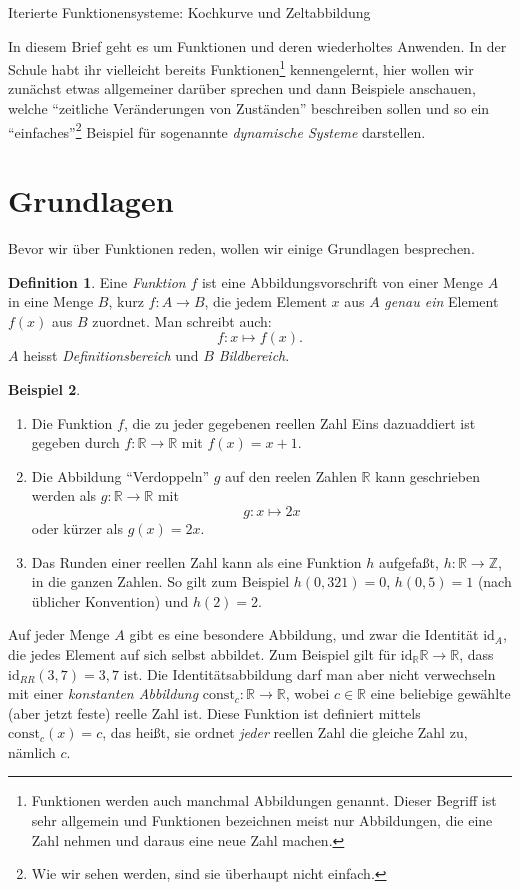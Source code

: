 \documentclass[a4paper,ngerman,12pt]{zirkelblatt1415}
\theoremstyle{definition}
\newtheorem{definition}{Definition}
\newtheorem{beispiel}[definition]{Beispiel}
\theoremstyle{remark}
\newcommand{\RR}{\mathbb{R}}
\newcommand{\lra}{\longrightarrow}
\newcommand{\id}{\text{id}}
\begin{document}
\begin{center}\Large{Iterierte Funktionensysteme: Kochkurve und Zeltabbildung}\end{center}

In diesem Brief geht es um Funktionen und deren wiederholtes Anwenden. In der Schule habt ihr vielleicht bereits Funktionen\footnote{Funktionen werden auch manchmal Abbildungen genannt. Dieser Begriff ist sehr allgemein und Funktionen bezeichnen meist nur Abbildungen, die eine Zahl nehmen und daraus eine neue Zahl machen.} kennengelernt, hier wollen wir zunächst etwas allgemeiner darüber sprechen und dann Beispiele anschauen, welche "`zeitliche Veränderungen von Zuständen"' beschreiben sollen und so ein "`einfaches"'\footnote{Wie wir sehen werden, sind sie überhaupt nicht einfach.} Beispiel für sogenannte \emph{dynamische Systeme} darstellen.

\section{Grundlagen}

Bevor wir über Funktionen reden, wollen wir einige Grundlagen besprechen.
\begin{definition}
Eine \emph{Funktion} $f$ ist eine Abbildungsvorschrift von einer Menge $A$ in eine Menge $B$, kurz $f:A\rightarrow B$, die jedem Element $x$ aus $A$ \emph{genau ein} Element $f(x)$ aus $B$ zuordnet.
Man schreibt auch:
\[
f: x \mapsto f(x).
\]
$A$ heisst \emph{Definitionsbereich} und $B$ \emph{Bildbereich}.
\end{definition}

\begin{beispiel}
\begin{enumerate}
\item Die Funktion $f$, die zu jeder gegebenen reellen Zahl Eins dazuaddiert ist gegeben durch $f:\RR\lra\RR$ mit $f(x)=x+1$.
\item Die Abbildung "`Verdoppeln"' $g$ auf den reelen Zahlen $\mathbb{R}$ kann geschrieben werden als $g:\mathbb{R}\rightarrow\mathbb{R}$ mit
\[
g : x \mapsto 2x
\]
oder kürzer als $g(x)=2x$.
\item Das Runden einer reellen Zahl kann als eine Funktion $h$ aufgefaßt, $h:\mathbb{R}\longrightarrow\mathbb{Z}$, in die ganzen Zahlen. So gilt zum Beispiel $h(0,321)=0$, $h(0,5)=1$ (nach üblicher Konvention) und $h(2)=2$.
\end{enumerate}
\end{beispiel}

Auf jeder Menge $A$ gibt es eine besondere Abbildung, und zwar die Identität $\text{id}_A$, die jedes Element auf sich selbst abbildet. Zum Beispiel gilt für $\id_{\RR}\RR\lra\RR$, dass $\id_{RR}(3,7)=3,7$ ist. Die Identitätsabbildung darf man aber nicht verwechseln mit einer \emph{konstanten Abbildung} $\text{const}_{c}:\RR\lra\RR$, wobei $c\in\RR$ eine beliebige gewählte (aber jetzt feste) reelle Zahl ist. Diese Funktion ist definiert mittels $\text{const}_c(x)=c$, das heißt, sie ordnet \emph{jeder} reellen Zahl die gleiche Zahl zu, nämlich $c$.
\end{document}
